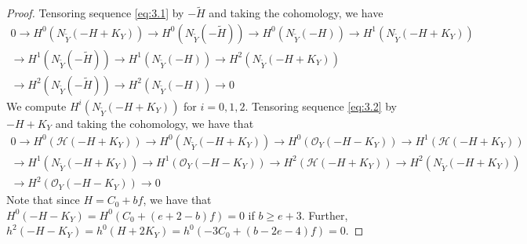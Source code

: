 \documentclass[11pt,twoside]{amsart}
\theoremstyle{plain}
\theoremstyle{definition}
\newcommand{\OO}{\mathcal{O}}
\newcommand{\Yt}{\widetilde{Y}}
\newcommand{\Ht}{\widetilde{H}}
\newcommand{\NYt}{N_{\Yt}}
\newcommand{\Hc}{\mathcal{H}}
\begin{document}
\begin{proof}
Tensoring sequence \eqref{eq:3.1} by $-\Ht$ and taking the cohomology, we have
\begin{multline}\label{eq:3.40}
0\to H^0(\NYt(-H+K_Y))\to H^0(\NYt(-\Ht))\to H^0(\NYt(-H))\to H^1(\NYt(-H+K_Y))\\
\to H^1(\NYt(-\Ht))\to H^1(\NYt(-H))\to H^2(\NYt(-H+K_Y))\\
\to H^2(\NYt(-\Ht))\to H^2(\NYt(-H))\to 0
\end{multline}
We compute $H^i(\NYt(-H+K_Y))$ for $i=0,1,2$. Tensoring sequence \eqref{eq:3.2} by $-H+K_Y$ and taking the cohomology, we have that
\begin{multline}\label{eq:3.41}
0\to H^0(\Hc(-H+K_Y))\to H^0(\NYt(-H+K_Y))\to H^0(\OO_Y(-H-K_Y))\to H^1(\Hc(-H+K_Y))\\
\to H^1(\NYt(-H+K_Y))\to H^1(\OO_Y(-H-K_Y))\to H^2(\Hc(-H+K_Y))\to H^2(\NYt(-H+K_Y))\\
\to H^2(\OO_Y(-H-K_Y))\to 0
\end{multline}
Note that since $H=C_0+bf$, we have that $H^0(-H-K_Y)=H^0(C_0+(e+2-b)f)=0$ if $b\ge e+3$. Further, $h^2(-H-K_Y)=h^0(H+2K_Y)=h^0(-3C_0+(b-2e-4)f)=0$.


\end{proof}
\end{document}
